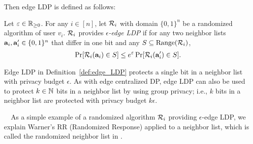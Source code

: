 Then edge LDP is defined as follows: 

\begin{definition}  \label{def:edge_LDP} 
Let $\varepsilon \in \mathbb{R}_{\ge0}$. 
For any $i \in [n]$, let $\mathcal{R}_i$ with domain $\{0,1\}^n$ be a randomized algorithm of user $v_i$. 
$\mathcal{R}_i$ 
provides \emph{$\epsilon$-edge LDP} 
if for any two neighbor lists 
$\mathbf{a}_i, \mathbf{a}'_i \in \{0,1\}^n$ 
that differ in one bit and any 
$S \subseteq \mathrm{Range}(\mathcal{R}_i)$, 
\begin{align}
\Pr[\mathcal{R}_i(\mathbf{a}_i) \in S] \leq e^\varepsilon \Pr[\mathcal{R}_i(\mathbf{a}'_i) \in S].
\label{eq:edge_LDP}
\end{align}
\end{definition}
Edge LDP in Definition~\ref{def:edge_LDP} protects 
a single bit in a neighbor list with privacy budget $\epsilon$. 
As with edge centralized DP, edge LDP can also be 
used 
to protect $k \in \mathbb{N}$ 
bits in a neighbor list 
by using group privacy; i.e., $k$ bits in a neighbor list are protected with privacy budget $k\epsilon$. 


\smallskip
~~As a simple example of a randomized algorithm 
$\mathcal{R}_i$ 
providing $\epsilon$-edge LDP, we explain 
Warner's RR (Randomized Response) \cite{Warner_JASA65} applied to a neighbor list, 
which is called 
the randomized neighbor list in \cite{Qin_CCS17}. 

